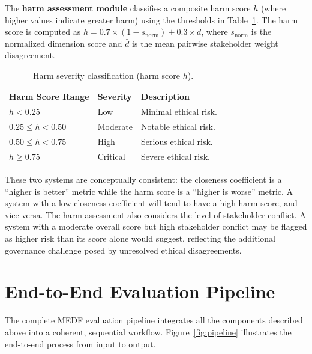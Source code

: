 The \textbf{harm assessment module} classifies a composite harm score $h$ (where higher values indicate greater harm) using the thresholds in Table~\ref{tab:risk_levels_harm}. The harm score is computed as $h = 0.7 \times (1 - s_{\text{norm}}) + 0.3 \times \bar{d}$, where $s_{\text{norm}}$ is the normalized dimension score and $\bar{d}$ is the mean pairwise stakeholder weight disagreement.

\begin{table}[H]
\centering
\caption{Harm severity classification (harm score $h$).}
\label{tab:risk_levels_harm}
\begin{tabular}{@{}lll@{}}
\toprule
\textbf{Harm Score Range} & \textbf{Severity} & \textbf{Description} \\
\midrule
$h < 0.25$ & Low & Minimal ethical risk. \\
$0.25 \leq h < 0.50$ & Moderate & Notable ethical risk. \\
$0.50 \leq h < 0.75$ & High & Serious ethical risk. \\
$h \geq 0.75$ & Critical & Severe ethical risk. \\
\bottomrule
\end{tabular}
\end{table}

These two systems are conceptually consistent: the closeness coefficient is a \enquote{higher is better} metric while the harm score is a \enquote{higher is worse} metric. A system with a low closeness coefficient will tend to have a high harm score, and vice versa. The harm assessment also considers the level of stakeholder conflict. A system with a moderate overall score but high stakeholder conflict may be flagged as higher risk than its score alone would suggest, reflecting the additional governance challenge posed by unresolved ethical disagreements.

\section{End-to-End Evaluation Pipeline}
\label{sec:pipeline}

The complete MEDF evaluation pipeline integrates all the components described above into a coherent, sequential workflow. Figure~\ref{fig:pipeline} illustrates the end-to-end process from input to output.

